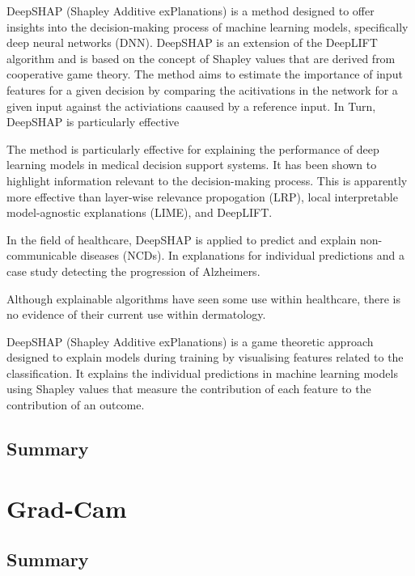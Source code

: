 DeepSHAP (Shapley Additive exPlanations) is a method designed to offer insights into the decision-making process of machine learning models, specifically deep neural networks (DNN). DeepSHAP is an extension of the DeepLIFT algorithm and is based on the concept of Shapley values that are derived from cooperative game theory. The method aims to estimate the importance of input features for a given decision by comparing the acitivations in the network for a given input against the activiations caaused by a reference input. In Turn, DeepSHAP is particularly effective

The method is particularly effective for explaining the performance of deep learning models in medical decision support systems\cite{}. It has been shown to highlight information relevant to the decision-making process. This is apparently more effective than layer-wise relevance propogation (LRP), local interpretable model-agnostic explanations (LIME), and DeepLIFT.

In the field of healthcare, DeepSHAP is applied to predict and explain non-communicable diseases (NCDs). In explanations for individual predictions and a case study detecting the progression of Alzheimers. 

Although explainable algorithms have seen some use within healthcare, there is no evidence of their current use within dermatology.

DeepSHAP (Shapley Additive exPlanations) is a game theoretic approach designed to explain models during training by visualising features related to the classification. It explains the individual predictions in machine learning models using Shapley values that measure the contribution of each feature to the contribution of an outcome\cite{Aas2021}.



\subsection{Summary}

\section{Grad-Cam}




\subsection{Summary}

